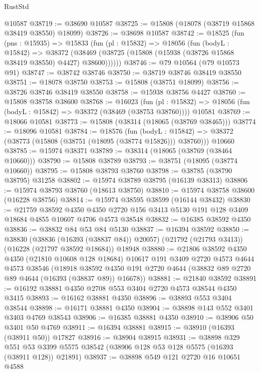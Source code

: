 \begin{lexlean}{RustStd}
\begin{coremodule}
    @10587
@38719 := @38690 @10587
@38725 := @15808 (@18078 (@38719 @15868 @38419 @38550) @18099)
@38726 := @38698 @10587
@38742 := @18525
    (fun (pns : @15935) =>
    @15833
      (fun (pl : @15832) =>
      @18056
        (fun (bodyL : @15842) =>
        @38372 (@38469 (@38725 (@15808 (@15938 (@38726 @15868 @38419 @38550) @4427) @38600))))))
@38746 := @79 @10564 (@79 @10573 @91)
@38747 := @38742 @38746
@38750 := @38719 @38746 @38419 @38550
@38751 := @18078 @38750
@38753 := @15808 (@38751 @18099)
@38756 := @38726 @38746 @38419 @38550
@38758 := @15938 @38756 @4427
@38760 := @15808 @38758 @38600
@38768 := @16023
    (fun (pl : @15832) => @18056 (fun (bodyL : @15842) => @38372 (@38469 (@38753 @38760))))
    @10581
@38769 := @18066 @10581
@38773 := @15808 (@38314 (@18065 (@38769 @38465)))
@38774 := @18096 @10581
@38784 := @18576
    (fun (bodyL : @15842) => @38372 (@38773 (@15808 (@38751 (@18095 (@38774 @15826))) @38760)))
    @10660
@38785 := @15974 @38371
@38789 := @38314 (@18065 (@38769 (@38464 @10660)))
@38790 := @15808 @38789
@38793 := @38751 (@18095 (@38774 @10660))
@38795 := @15808 @38793 @38760
@38798 := @38785 (@38790 @38795) @31258
@38802 := @15974 @38789 @38795 (@16139 @38313)
@38806 := @15974 @38793 @38760 (@18613 @38750)
@38810 := @15974 @38758 @38600 (@16228 @38756)
@38814 := @15974 @38595 @38599 (@16144 @38432)
@38830 := @21759
    @38592
    @4350
    @4350
    @2720
    @156
    @3413
    @5130
    @191
    @128
    @3409
    @18684
    @4855
    @10607
    @4706
    @4573
    @38548
@38832 := @16385 @38592 @4350
@38836 := @38832 @84 @53 @84 @5130
@38837 := @16394 @38592
@38850 := @38830
    (@38836 (@16393 (@38837 @84)) @20057)
    (@21792 (@21793 @3413))
    (@16228 (@21797 @38592 @18684))
    @18948
@38880 := @21806
    @38592
    @4350
    @4350
    (@21810 @10608 @128 @18684)
    @10617
    @191
    @3409
    @2720
    @4573
    @4644
    @4573
    @38546
    (@18918 @38592 @4350 @191 @2720 @4644 (@38832 @89 @2720 @89 @4644 (@16393 (@38837 @89)) @16678))
@38881 := @21840 @38592
@38891 := @16192 @38881 @4350 @2708 @553 @3404 @2720 @4573 @38544 @4350 @3415
@38893 := @16162 @38881 @4350
@38896 := @38893 @553 @3404 @38544
@38898 := @16171 @38881 @4350
@38904 := @38898 @143 @552 @3401 @3403 @4769 @38543
@38906 := @16385 @38881 @4350
@38910 := @38906 @50 @3401 @50 @4769
@38911 := @16394 @38881
@38915 := @38910 (@16393 (@38911 @50)) @17827
@38916 := @38904 @38915
@38931 := @38898
    @329
    @551
    @53
    @3399
    @5575
    @38542
    (@38906 @128 @53 @128 @5575 (@16393 (@38911 @128)) @21891)
@38937 := @38898 @549 @121 @2720 @16 @10651 @4588

\end{coremodule}
\end{lexlean}
